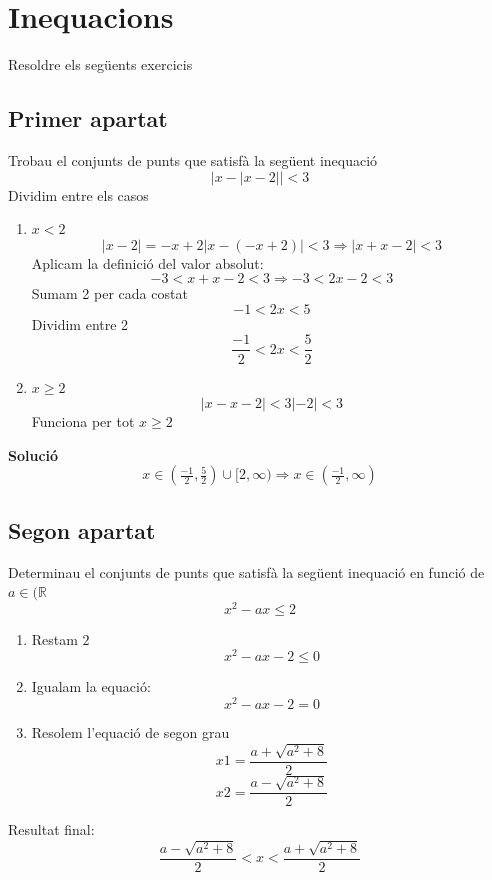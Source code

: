 \section{Inequacions}
Resoldre els següents exercicis 
\subsection{Primer apartat}
Trobau el conjunts de punts que satisfà la següent inequació 
\[
|x-|x-2|| < 3
\]
Dividim entre els casos 

\begin{enumerate}
\item $x<2$
\[
|x-2|= -x + 2 
|x-(-x+2)| < 3 \Longrightarrow |x+x -2| < 3 
\]
Aplicam la definició del valor absolut: 
\[ 
-3<x+x-2<3 \Longrightarrow -3<2x-2<3
\]
Sumam 2 per cada costat
\[
-1<2x<5
\]
Dividim entre 2
\[
\dfrac{-1}{2}<2x<\dfrac{5}{2}
\]
\item $x\geq2$
\[
|x-x-2| < 3 
|-2| < 3 
\]
Funciona per tot $x\geq2$

\end{enumerate}
\textbf{Solució}
\[
x \in (\tfrac{-1}{2},\tfrac{5}{2})\cup[2,\infty) \Longrightarrow x\in (\tfrac{-1}{2},\infty)
\]
\subsection{Segon apartat}
Determinau el conjunts de punts que satisfà la següent inequació en funció de $a\in (\mathbb{R} $
\[
x^2 -ax \leq 2
\]
\begin{enumerate}
\item Restam $2$
\[
x^2 -ax -2 \leq 0
\]
\item Igualam la equació:
\[
x^2 -ax -2 = 0
\]
\item Resolem l'equació de segon grau 
\[
x1 = \dfrac{a + \sqrt{a^2+8}}{2}
\]
\[
x2 = \dfrac{a- \sqrt{a^2+8}}{2}
\]
\end{enumerate}
Resultat final: 
\[
\dfrac{a - \sqrt{a^2+8}}{2} < x < \dfrac{a + \sqrt{a^2+8}}{2}
\]